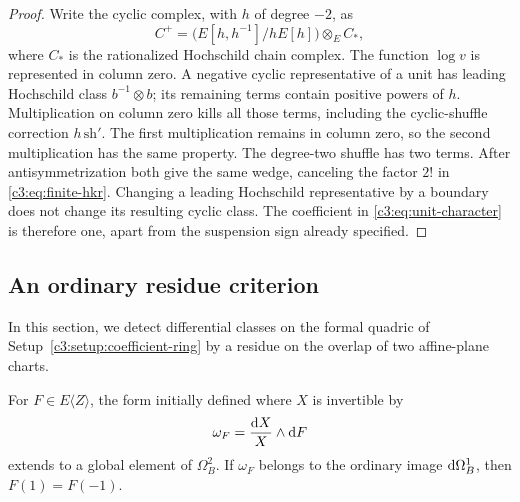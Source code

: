 \begin{proof}
Write the cyclic complex, with $h$ of degree $-2$, as
\[
 C^+=\bigl(E[h,h^{-1}]/hE[h]\bigr)\otimes_E C_\ast,
\]
where $C_\ast$ is the rationalized Hochschild chain complex.
The function $\log v$ is represented in column zero.
A negative cyclic representative of a unit has leading Hochschild
class $b^{-1}\otimes b$; its remaining terms contain positive powers
of $h$.
Multiplication on column zero kills all those terms, including the
cyclic-shuffle correction $h\,\mathrm{sh}'$.
The first multiplication remains in column zero, so the second
multiplication has the same property.
The degree-two shuffle has two terms.
After antisymmetrization both give the same wedge, canceling the
factor $2!$ in \eqref{c3:eq:finite-hkr}.
Changing a leading Hochschild representative by a boundary does not
change its resulting cyclic class.
The coefficient in \eqref{c3:eq:unit-character} is therefore one,
apart from the suspension sign already specified.
\end{proof}

\subsection{An ordinary residue criterion}\label{c3:sec:residue}

In this section, we detect differential classes on the formal quadric
of Setup~\ref{c3:setup:coefficient-ring} by a residue on the overlap of two
affine-plane charts.

\begin{lemma}
\label{c3:lem:ordinary-residue}
For $F\in E\langle Z\rangle$, the form initially defined where $X$ is
invertible by
\[
 \omega_F=\frac{\mathrm{d} X}{X}\wedge\mathrm{d} F
\]
extends to a global element of $\Omega_B^2$.
If $\omega_F$ belongs to the ordinary image $\mathrm{d}\Omega_B^1$, then
$F(1)=F(-1)$.
\end{lemma}

